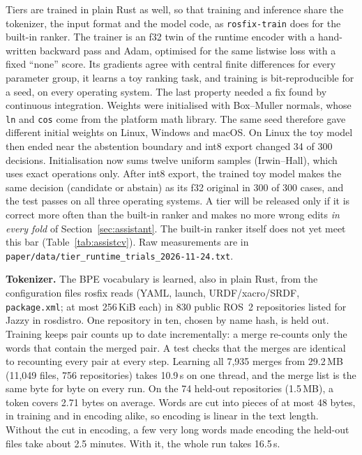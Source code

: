 \documentclass[conference]{IEEEtran}
\newcommand{\code}[1]{\texttt{#1}}
\begin{document}
Tiers are trained in plain Rust as well, so that training and inference share the tokenizer, the
input format and the model code, as \code{rosfix-train} does for the built-in ranker. The trainer
is an f32 twin of the runtime encoder with a hand-written backward pass and Adam, optimised for
the same listwise loss with a fixed ``none'' score. Its gradients agree with central finite
differences for every parameter group, it learns a toy ranking task, and training is
bit-reproducible for a seed, on every operating system. The last property needed a fix found by
continuous integration. Weights were initialised with Box--Muller normals, whose \code{ln} and
\code{cos} come from the platform math library. The same seed therefore gave different initial
weights on Linux, Windows and macOS. On Linux the toy model then ended near the abstention boundary and int8
export changed 34 of 300 decisions. Initialisation now sums twelve uniform samples (Irwin--Hall),
which uses exact operations only. After int8 export, the trained toy model makes the same decision
(candidate or abstain) as its f32 original in 300 of 300 cases, and the test passes on all three
operating systems. A tier will be released only if it is correct more often than the built-in
ranker and makes no more wrong edits \emph{in every fold} of Section~\ref{sec:assistant}. The
built-in ranker itself does not yet meet this bar (Table~\ref{tab:assistcv}). Raw measurements are in
\code{paper/data/tier\_runtime\_trials\_2026-11-24.txt}.

\textbf{Tokenizer.} The BPE vocabulary is learned, also in plain Rust, from the configuration
files rosfix reads (YAML, launch, URDF/xacro/SRDF, \code{package.xml}; at most 256\,KiB each) in
830 public ROS~2 repositories listed for Jazzy in rosdistro. One repository in ten, chosen by name
hash, is held out. Training keeps pair counts up to date incrementally: a merge re-counts only the
words that contain the merged pair. A test checks that the merges are identical to recounting
every pair at every step. Learning all 7,935 merges from 29.2\,MB (11,049 files, 756 repositories)
takes 10.9\,s on one thread, and the merge list is the same byte for byte on every run. On the 74
held-out repositories (1.5\,MB), a token covers 2.71 bytes on average. Words are cut into pieces of
at most 48 bytes, in training and in encoding alike, so encoding is linear in the text length.
Without the cut in encoding, a few very long words made encoding the held-out files take about
2.5 minutes. With it, the whole run takes 16.5\,s.
\end{document}
